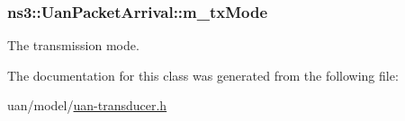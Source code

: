 \subsubsection[{\texorpdfstring{m\+\_\+tx\+Mode}{m_txMode}}]{ ns3\+::\+Uan\+Packet\+Arrival\+::m\+\_\+tx\+Mode\hspace{0.3cm}{\ttfamily [private]}}\hypertarget{classns3_1_1UanPacketArrival_aaab018dcef6c009ebfbf2e8c0a86bf29}{}\label{classns3_1_1UanPacketArrival_aaab018dcef6c009ebfbf2e8c0a86bf29}


The transmission mode. 



The documentation for this class was generated from the following file\+:\begin{DoxyCompactItemize}
\item 
uan/model/\hyperlink{uan-transducer_8h}{uan-\/transducer.\+h}\end{DoxyCompactItemize}
